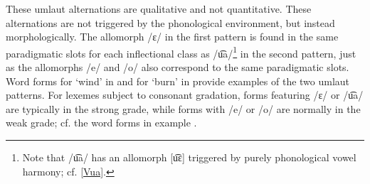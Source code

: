 These umlaut alternations are qualitative and not quantitative. %
These alternations are not triggered by the phonological environment, but instead morphologically. 
The allomorph /ɛ/ in the first pattern is found in the same paradigmatic slots for each inflectional class as /u͡a/\footnote{Note that /u͡a/ has an allomorph [u͡ɛ] triggered by purely phonological vowel harmony; cf. \SEC\ref{Vua}.} 
in the second pattern, just as the allomorphs /e/ and /o/ also correspond to the same paradigmatic slots. 
Word forms for  ‘wind’ in  and for  ‘burn’ in  provide examples of the two umlaut patterns.
\ea\label{umlautEx1}%
\z
%
\ea\label{umlautEx2}%
\Tn{\begin{tabular}{c c}
/p{u͡a}lːta/		&/p{o}lta/\\
\It{buallda}		&\It{buolda}\\
ignite\BS\Sc{3sg.prs}	&ignite\BS\Sc{2sg.prs}\\
\end{tabular}
\hfill\hyperlink{pit101208}{{\small [pit101208]}}}
\z
For lexemes subject to consonant gradation, forms featuring /ɛ/ or /u͡a/ are typically in the strong grade, while forms with /e/ or /o/ are normally in the weak grade; cf. the word forms in example . 


